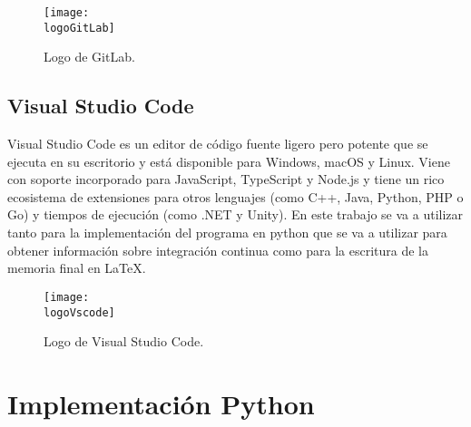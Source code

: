 \begin{figure}[h]
    \centering
    \texttt{[image: \\logoGitLab]}
    \caption{Logo de GitLab.}
\end{figure}

\subsection{Visual Studio Code}
Visual Studio Code es un editor de código fuente ligero pero potente que se ejecuta en su escritorio y está disponible para Windows, macOS y Linux. Viene con soporte incorporado para JavaScript, TypeScript y Node.js y tiene un rico ecosistema de extensiones para otros lenguajes  (como C++, Java, Python, PHP o Go) y tiempos de ejecución (como .NET y Unity).
En este trabajo se va a utilizar tanto para la implementación del programa en python que se va a utilizar para obtener información sobre integración continua como para la escritura de la memoria final en LaTeX.

\begin{figure}[h]
    \centering
    \texttt{[image: \\logoVscode]}
    \caption{Logo de Visual Studio Code.}
\end{figure}

\section{Implementación Python}

